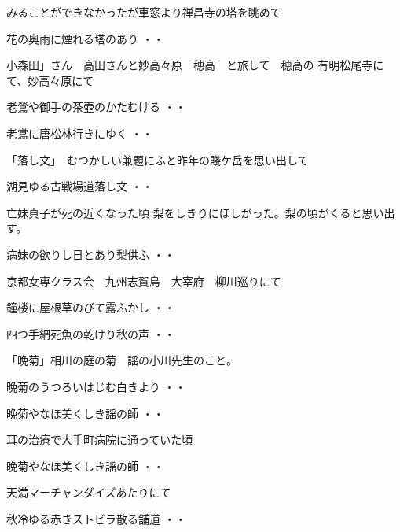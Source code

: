 みることができなかったが車窓より禅昌寺の塔を眺めて
\begin{shiika}花の奥雨に煙れる塔のあり
\hfill{・・}\end{shiika}
\vspace{0.6cm}
小森田」さん　高田さんと妙高々原　穂高　と旅して　穂高の
有明松尾寺にて、妙高々原にて
\begin{shiika}老鶯や御手の茶壺のかたむける
\hfill{・・}\end{shiika}
\begin{shiika}老鴬に唐松林行きにゆく
\hfill{・・}\end{shiika}
「落し文」　むつかしい兼題にふと昨年の賤ケ岳を思い出して
\begin{shiika}湖見ゆる古戦場道落し文
\hfill{・・}\end{shiika}
\vspace{0.6cm}
亡妹貞子が死の近くなった頃
梨をしきりにほしがった。梨の頃がくると思い出す。
\begin{shiika}病妹の欲りし日とあり梨供ふ
\hfill{・・}\end{shiika}
\vspace{0.6cm}
京都女専クラス会　九州志賀島　大宰府　柳川巡りにて
\begin{shiika}鐘楼に屋根草のびて露ふかし
\hfill{・・}\end{shiika}
\begin{shiika}四つ手網死魚の乾けり秋の声
\hfill{・・}\end{shiika}
\vspace{0.6cm}
「晩菊」相川の庭の菊　謡の小川先生のこと。
\begin{shiika}晩菊のうつろいはじむ白きより
\hfill{・・}\end{shiika}
\begin{shiika}晩菊やなほ美くしき謡の師
\hfill{・・}\end{shiika}
\vspace{0.6cm}
耳の治療で大手町病院に通っていた頃
\begin{shiika}晩菊やなほ美くしき謡の師
\hfill{・・}\end{shiika}
\vspace{0.6cm}
天満マーチャンダイズあたりにて
\begin{shiika}秋冷ゆる赤きストビラ散る舗道
\hfill{・・}\end{shiika}
